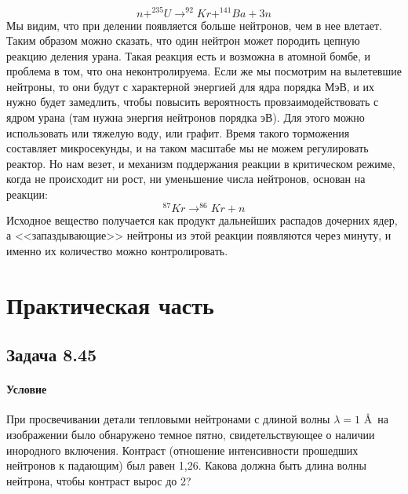 \documentclass[12pt]{article}
\begin{document}
\begin{equation*}
    n + ^{235}U \rightarrow ^{92}Kr + ^{141}Ba + 3n
\end{equation*}
Мы видим, что при делении появляется больше нейтронов, чем в нее влетает. Таким образом можно сказать, что один нейтрон может породить цепную реакцию деления урана. Такая реакция есть и возможна в атомной бомбе, и проблема в том, что она неконтролируема. Если же мы посмотрим на вылетевшие нейтроны, то они будут с характерной энергией для ядра порядка МэВ, и их нужно будет замедлить, чтобы повысить вероятность провзаимодействовать с ядром урана (там нужна энергия нейтронов порядка эВ). Для этого можно использовать или тяжелую воду, или графит. Время такого торможения составляет микросекунды, и на таком масштабе мы не можем регулировать реактор. Но нам везет, и механизм поддержания реакции в критическом режиме, когда не происходит ни рост, ни уменьшение числа нейтронов, основан на реакции:
\begin{equation*}
    ^{87}Kr \rightarrow ^{86}Kr + n
\end{equation*}
Исходное вещество получается как продукт дальнейших распадов дочерних ядер, а <<запаздывающие>> нейтроны из этой реакции появляются через минуту, и именно их количество можно контролировать.

\section{Практическая часть}

\subsection{Задача 8.45}
\label{task_}
\paragraph{Условие}
При просвечивании детали тепловыми нейтронами с длиной волны $\lambda = 1$ \AA \, на изображении было обнаружено темное пятно, свидетельствующее о наличии инородного включения. Контраст (отношение интенсивности прошедших нейтронов к падающим) был равен 1,26. Какова должна быть длина волны нейтрона, чтобы контраст вырос до 2?
\end{document}
